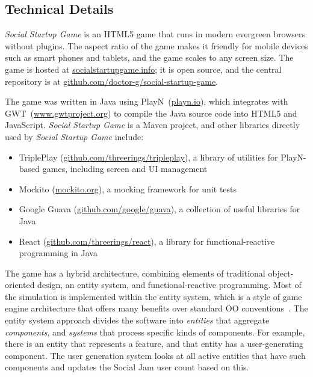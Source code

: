 \documentclass[letterpaper]{article}
\begin{document}
\subsection{Technical Details}

\textit{Social Startup Game} is an HTML5 game that runs
in modern evergreen browsers without plugins. The aspect
ratio of the game makes it friendly for mobile devices such as smart
phones and tablets, and the game scales to any screen size.  The game
is hosted at \url{socialstartupgame.info}; it is open source, and the
central repository is at
\url{github.com/doctor-g/social-startup-game}.

The game was written in Java using PlayN~(\url{playn.io}),
which integrates with GWT~(\url{www.gwtproject.org})
to compile the Java source code into
HTML5 and JavaScript. 
\textit{Social Startup Game} is a Maven project, and other
libraries directly 
used by \textit{Social Startup Game} include: 
\begin{itemize}
\item TriplePlay (\url{github.com/threerings/tripleplay}), 
 a library of utilities for PlayN-based games, including 
 screen and UI management
\item Mockito (\url{mockito.org}), a mocking framework for unit tests
\item Google Guava (\url{github.com/google/guava}), a collection
 of useful libraries for Java
\item React (\url{github.com/threerings/react}), a library for
 functional-reactive programming in Java
\end{itemize}

The game has a hybrid architecture, combining elements of traditional
object-oriented design, an entity system, and functional-reactive
programming.
Most of the simulation is implemented within the entity system,
which is a style of game engine architecture that offers many benefits over
standard OO conventions~\citep{Gestwicki2012,Nystrom2014}. The entity system
approach divides the software into \textit{entities} that
aggregate \textit{components}, and \textit{systems} that process 
specific kinds of components.
For example, there is an entity that represents a feature, and that
entity has a user-generating component. The user generation system
looks at all active entities that have such components and updates
the Social Jam user count based on this.
\end{document}

